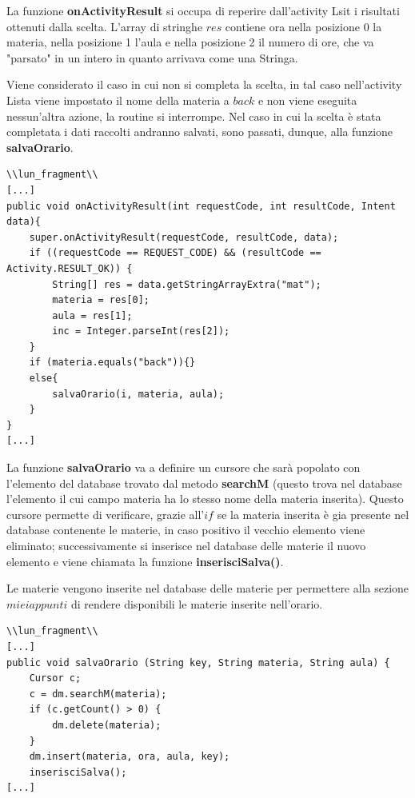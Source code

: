 \documentclass[a4paper, 50pt, twoside]{article}
\begin{document}
La funzione \textbf{onActivityResult} si occupa di reperire dall'activity Lsit i risultati ottenuti dalla scelta. L'array di stringhe $res$ contiene ora nella posizione 0 la materia, nella posizione 1 l'aula e nella posizione 2 il numero di ore, che va "parsato" in un intero in quanto arrivava come una Stringa.

Viene considerato il caso in cui non si completa la scelta, in tal caso nell'activity Lista viene impostato il nome della materia a $back$ e non viene eseguita nessun'altra azione, la routine si interrompe. Nel caso in cui la scelta è stata completata i dati raccolti andranno salvati, sono passati, dunque, alla funzione \textbf{salvaOrario}.

\begin{lstlisting}
\\lun_fragment\\
[...]
public void onActivityResult(int requestCode, int resultCode, Intent data){
	super.onActivityResult(requestCode, resultCode, data);
	if ((requestCode == REQUEST_CODE) && (resultCode == Activity.RESULT_OK)) {
		String[] res = data.getStringArrayExtra("mat");
		materia = res[0];
		aula = res[1];
		inc = Integer.parseInt(res[2]);
	}
	if (materia.equals("back")){}
	else{
		salvaOrario(i, materia, aula);
	}
}
[...]
\end{lstlisting}

La funzione \textbf{salvaOrario} va a definire un cursore che sarà popolato con l'elemento del database trovato dal metodo \textbf{searchM} (questo trova nel database l'elemento il cui campo materia ha lo stesso nome della materia inserita).
Questo cursore permette di verificare, grazie all'$if$ se la materia inserita è gia presente nel database contenente le materie, in caso positivo il vecchio elemento viene eliminato; successivamente si inserisce nel database delle materie il nuovo elemento e viene chiamata la funzione \textbf{inserisciSalva()}.

Le materie vengono inserite nel database delle materie per permettere alla sezione $miei appunti$ di rendere disponibili le materie inserite nell'orario.

\begin{lstlisting}
\\lun_fragment\\
[...]
public void salvaOrario (String key, String materia, String aula) {
	Cursor c;
	c = dm.searchM(materia);
	if (c.getCount() > 0) {
		dm.delete(materia);
	}
	dm.insert(materia, ora, aula, key);
	inserisciSalva();
[...]
\end{lstlisting}
\end{document}
